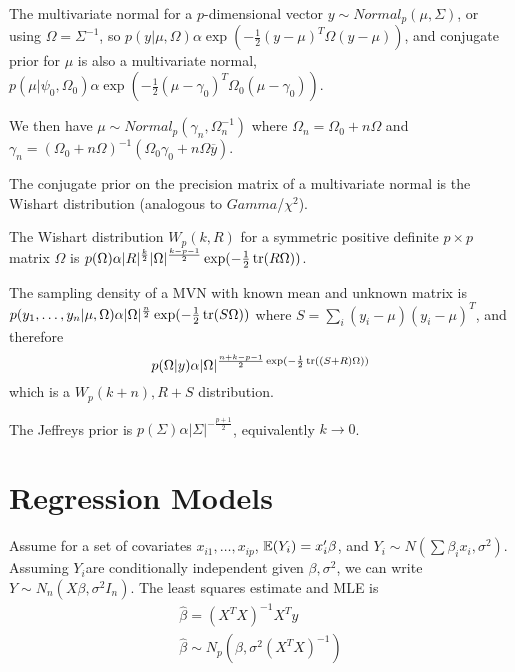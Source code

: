 \begin{defn}
  \label{sec:mult-distr-2}
  The multivariate normal for a $p$-dimensional vector $y \sim
  Normal_{p}(\mu, \Sigma)$, or using $\Omega = \Sigma^{-1}$, so $p(y |
  \mu, \Omega) \alpha \exp(-\frac{1}{2} (y-\mu)^{T} \Omega (y -
  \mu))$, and conjugate prior for $\mu$ is also a multivariate normal,
  $p(\mu | \psi_{0}, \Omega_{0}) \alpha \exp(-\frac{1}{2} (\mu -
  \gamma_{0})^{T} \Omega_{0} (\mu - \gamma_{0}))$.

  We then have $\mu \sim Normal_{p}(\gamma_{n}, \Omega_{n}^{-1})$
  where $\Omega_{n} = \Omega_{0} + n \Omega$ and $\gamma_{n} =
  (\Omega_{0} + n \Omega)^{-1}(\Omega_{0} \gamma_{0} + n \Omega
  \overline y)$.
\end{defn}

\begin{defn}
  \label{sec:mult-distr-3}
  The conjugate prior on the precision matrix of a multivariate normal
  is the Wishart distribution (analogous to $Gamma$/$\chi^{2}$).

  The Wishart distribution $W_{p}(k, R)$ for a symmetric positive
  definite $p \times p$ matrix $\Omega$ is $p(\Omega) \alpha
  |R|^{\frac{k}{2}} |\Omega|^{\frac{k-p-1}{2}} \exp (-\frac{1}{2}
  \operatorname*{tr}(R \Omega))$.

  The sampling density of a MVN with known mean and unknown matrix is
  $p(y_{1}, \dots, y_{n} | \mu, \Omega) \alpha |\Omega|^{\frac{n}{2}}
  \exp(-\frac{1}{2} \operatorname*{tr}(S \Omega))$ where $S = \sum_{i}^{} (y_{i} -
  \mu)(y_{i} - \mu)^{T}$, and therefore
  \begin{equation}
    \label{eq:16}
    p(\Omega | y) \alpha |\Omega|^{\frac{n+k-p-1}{2} \exp(-\frac{1}{2} \operatorname*{tr}((S+R)\Omega))}
  \end{equation} which is a $W_{p}(k+n), R+S$ distribution.

  The Jeffreys prior is $p(\Sigma) \alpha |\Sigma|^{-\frac{p+1}{2}}$,
  equivalently $k \rightarrow 0$.
\end{defn}


\section{Regression Models}
\label{sec:regression-models}

Assume for a set of covariates $x_{i1}, \dots, x_{ip}$, $\E{Y_{i}} =
x_{i}' \beta$, and $Y_{i} \sim N(\sum \beta_{i} x_{i}, \sigma^{2})$.
Assuming $Y_{i}$are conditionally independent given $\beta,
\sigma^{2}$, we can write $Y \sim N_{n}(X \beta, \sigma^{2} I_{n})$.
The least squares estimate and MLE is
\begin{align}
  \label{eq:17}
  \hat \beta = (X^{T} X)^{-1} X^{T} y \\
  \label{eq:18}
  \hat \beta \sim N_{p}(\beta, \sigma^{2}(X^{T} X)^{-1})
\end{align}

